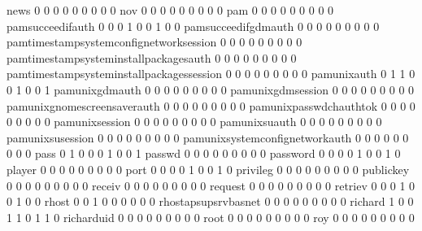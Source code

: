 \documentclass[compress,8pt]{beamer}
\begin{document}
\begin{frame}
\begin{Schunk}
  news                                       0   0   0   0   0   0   0   0   0
  nov                                        0   0   0   0   0   0   0   0   0
  pam                                        0   0   0   0   0   0   0   0   0
  pamsucceedifauth                           0   0   0   1   0   0   1   0   0
  pamsucceedifgdmauth                        0   0   0   0   0   0   0   0   0
  pamtimestampsystemconfignetworksession     0   0   0   0   0   0   0   0   0
  pamtimestampsysteminstallpackagesauth      0   0   0   0   0   0   0   0   0
  pamtimestampsysteminstallpackagessession   0   0   0   0   0   0   0   0   0
  pamunixauth                                0   1   1   0   0   1   0   0   1
  pamunixgdmauth                             0   0   0   0   0   0   0   0   0
  pamunixgdmsession                          0   0   0   0   0   0   0   0   0
  pamunixgnomescreensaverauth                0   0   0   0   0   0   0   0   0
  pamunixpasswdchauthtok                     0   0   0   0   0   0   0   0   0
  pamunixsession                             0   0   0   0   0   0   0   0   0
  pamunixsuauth                              0   0   0   0   0   0   0   0   0
  pamunixsusession                           0   0   0   0   0   0   0   0   0
  pamunixsystemconfignetworkauth             0   0   0   0   0   0   0   0   0
  pass                                       0   1   0   0   0   1   0   0   1
  passwd                                     0   0   0   0   0   0   0   0   0
  password                                   0   0   0   0   1   0   0   1   0
  player                                     0   0   0   0   0   0   0   0   0
  port                                       0   0   0   0   1   0   0   1   0
  privileg                                   0   0   0   0   0   0   0   0   0
  publickey                                  0   0   0   0   0   0   0   0   0
  receiv                                     0   0   0   0   0   0   0   0   0
  request                                    0   0   0   0   0   0   0   0   0
  retriev                                    0   0   0   1   0   0   1   0   0
  rhost                                      0   0   1   0   0   0   0   0   0
  rhostapsupsrvbasnet                        0   0   0   0   0   0   0   0   0
  richard                                    1   0   0   1   1   0   1   1   0
  richarduid                                 0   0   0   0   0   0   0   0   0
  root                                       0   0   0   0   0   0   0   0   0
  roy                                        0   0   0   0   0   0   0   0   0

\end{Schunk}
\end{frame}
\end{document}
